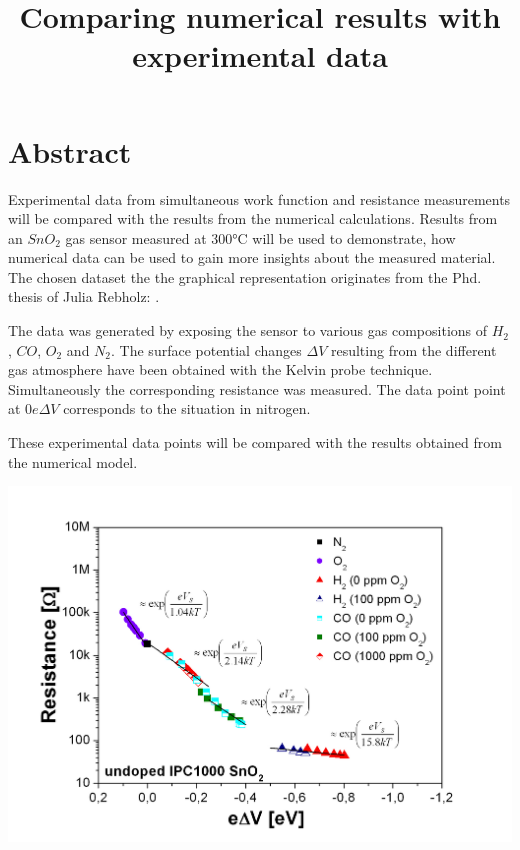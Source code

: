 \documentclass[11pt]{article}
\title{Comparing numerical results with experimental data}
\begin{document}
    
    \maketitle
    
    

    
    \setcounter{page}{87}
\tableofcontents 
\setcounter{section}{0}

    \hypertarget{abstract}{%
\section{Abstract}\label{abstract}}

Experimental data from simultaneous work function and resistance
measurements will be compared with the results from the numerical
calculations. Results from an \(SnO_2\) gas sensor measured at 300°C
will be used to demonstrate, how numerical data can be used to gain more
insights about the measured material. The chosen dataset the the
graphical representation originates from the Phd. thesis of Julia
Rebholz: \cite{Rebholz2016a}.

The data was generated by exposing the sensor to various gas
compositions of \(H_2\), \(CO\), \(O_2\) and \(N_2\). The surface
potential changes \(\Delta V\) resulting from the different gas
atmosphere have been obtained with the Kelvin probe technique.
Simultaneously the corresponding resistance was measured. The data point
point at \(0e\Delta V\) corresponds to the situation in nitrogen.

These experimental data points will be compared with the results
obtained from the numerical model.

    \includegraphics{media/IPC1000undoped_RgegqdV.JPG}
\end{document}
